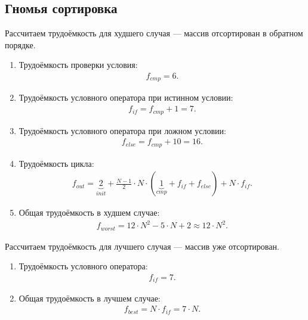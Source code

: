 \subsection{Гномья сортировка}
Рассчитаем трудоёмкость для худшего случая --- массив отсортирован в обратном порядке.
\begin{enumerate}
	\item Трудоёмкость проверки условия:
	\begin{equation}
		\begin{gathered}
			f_{cmp} = 6.
		\end{gathered}
	\end{equation}
	\item Трудоёмкость условного оператора при истинном условии:
	\begin{equation}
		\begin{gathered}
			f_{if} = f_{cmp} + 1 = 7.
		\end{gathered}
	\end{equation}
	\item Трудоёмкость условного оператора при ложном условии:
	\begin{equation}
		\begin{gathered}
			f_{else} = f_{cmp} + 10 = 16.
		\end{gathered}
	\end{equation}
	
	\item Трудоёмкость цикла:
	\begin{equation}
		\begin{gathered}
			f_{out} = \underbrace{2}_{init} + \frac{N - 1}{2} \cdot N \cdot (\underbrace{1}_{cmp} + f_{if} + f_{else}) + N \cdot f_{if}.
		\end{gathered}
	\end{equation}
	\item Общая трудоёмкость в худшем случае:
	\begin{equation}
		\begin{gathered}
			f_{worst} = 12 \cdot N^2 - 5 \cdot N + 2 \approx 12 \cdot N^2.
		\end{gathered}
	\end{equation}
\end{enumerate}	

\clearpage
Рассчитаем трудоёмкость для лучшего случая --- массив уже отсортирован.
\begin{enumerate}
	\item Трудоёмкость условного оператора:
	\begin{equation}
		\begin{gathered}
			f_{if} = 7.
		\end{gathered}
	\end{equation}
	\item Общая трудоёмкость в лучшем случае:
	\begin{equation}
		\begin{gathered}
			f_{best} = N \cdot f_{if} = 7 \cdot N.
		\end{gathered}
	\end{equation}
\end{enumerate}

